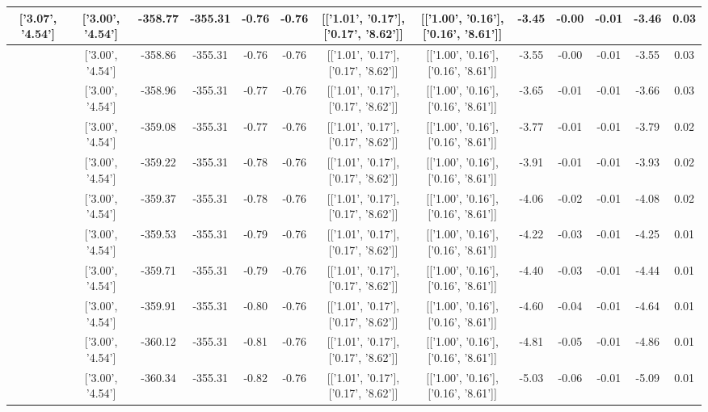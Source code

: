 \begin{table}[htbp]
\begin{adjustbox}{angle=90}
\begin{tabular}{|c|c|c|c|c|c|c|c|c|c|c|c|c|}
 ['3.07', '4.54'] & ['3.00', '4.54'] & -358.77 & -355.31 & -0.76 & -0.76 & [['1.01', '0.17'], ['0.17', '8.62']] & [['1.00', '0.16'], ['0.16', '8.61']] & -3.45 & -0.00 & -0.01 & -3.46 & 0.03\\ \hline
 ['3.08', '4.54'] & ['3.00', '4.54'] & -358.86 & -355.31 & -0.76 & -0.76 & [['1.01', '0.17'], ['0.17', '8.62']] & [['1.00', '0.16'], ['0.16', '8.61']] & -3.55 & -0.00 & -0.01 & -3.55 & 0.03\\ \hline
 ['3.09', '4.54'] & ['3.00', '4.54'] & -358.96 & -355.31 & -0.77 & -0.76 & [['1.01', '0.17'], ['0.17', '8.62']] & [['1.00', '0.16'], ['0.16', '8.61']] & -3.65 & -0.01 & -0.01 & -3.66 & 0.03\\ \hline
 ['3.10', '4.55'] & ['3.00', '4.54'] & -359.08 & -355.31 & -0.77 & -0.76 & [['1.01', '0.17'], ['0.17', '8.62']] & [['1.00', '0.16'], ['0.16', '8.61']] & -3.77 & -0.01 & -0.01 & -3.79 & 0.02\\ \hline
 ['3.11', '4.55'] & ['3.00', '4.54'] & -359.22 & -355.31 & -0.78 & -0.76 & [['1.01', '0.17'], ['0.17', '8.62']] & [['1.00', '0.16'], ['0.16', '8.61']] & -3.91 & -0.01 & -0.01 & -3.93 & 0.02\\ \hline
 ['3.13', '4.55'] & ['3.00', '4.54'] & -359.37 & -355.31 & -0.78 & -0.76 & [['1.01', '0.17'], ['0.17', '8.62']] & [['1.00', '0.16'], ['0.16', '8.61']] & -4.06 & -0.02 & -0.01 & -4.08 & 0.02\\ \hline
 ['3.14', '4.55'] & ['3.00', '4.54'] & -359.53 & -355.31 & -0.79 & -0.76 & [['1.01', '0.17'], ['0.17', '8.62']] & [['1.00', '0.16'], ['0.16', '8.61']] & -4.22 & -0.03 & -0.01 & -4.25 & 0.01\\ \hline
 ['3.15', '4.55'] & ['3.00', '4.54'] & -359.71 & -355.31 & -0.79 & -0.76 & [['1.01', '0.17'], ['0.17', '8.62']] & [['1.00', '0.16'], ['0.16', '8.61']] & -4.40 & -0.03 & -0.01 & -4.44 & 0.01\\ \hline
 ['3.16', '4.55'] & ['3.00', '4.54'] & -359.91 & -355.31 & -0.80 & -0.76 & [['1.01', '0.17'], ['0.17', '8.62']] & [['1.00', '0.16'], ['0.16', '8.61']] & -4.60 & -0.04 & -0.01 & -4.64 & 0.01\\ \hline
 ['3.17', '4.55'] & ['3.00', '4.54'] & -360.12 & -355.31 & -0.81 & -0.76 & [['1.01', '0.17'], ['0.17', '8.62']] & [['1.00', '0.16'], ['0.16', '8.61']] & -4.81 & -0.05 & -0.01 & -4.86 & 0.01\\ \hline
 ['3.19', '4.55'] & ['3.00', '4.54'] & -360.34 & -355.31 & -0.82 & -0.76 & [['1.01', '0.17'], ['0.17', '8.62']] & [['1.00', '0.16'], ['0.16', '8.61']] & -5.03 & -0.06 & -0.01 & -5.09 & 0.01\\ \hline

\end{tabular}
\end{adjustbox}
\end{table}
